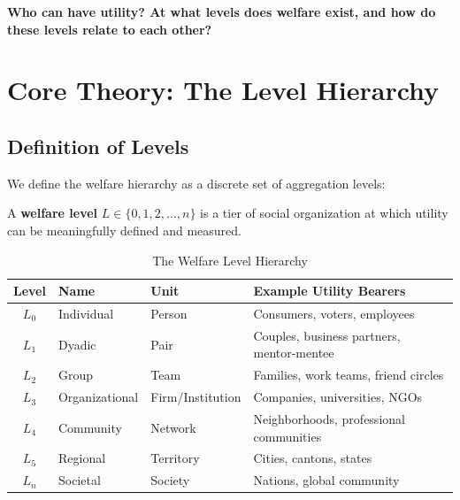 \begin{tcolorbox}[colback=red!5!white, colframe=red!75!black,
    title=The Fundamental Question]
\textbf{Who can have utility? At what levels does welfare exist, and how do these levels relate to each other?}
\end{tcolorbox}


\section{Core Theory: The Level Hierarchy}
\label{sec:who-levels}

\subsection{Definition of Levels}

We define the welfare hierarchy as a discrete set of aggregation levels:

\begin{definition}
A \textbf{welfare level} $L \in \{0, 1, 2, \ldots, n\}$ is a tier of social organization
at which utility can be meaningfully defined and measured.
\end{definition}

\begin{table}[htbp]
\centering
\caption{The Welfare Level Hierarchy}
\label{tab:who-levels}
\renewcommand{\arraystretch}{1.3}
\begin{tabular}{@{}clll@{}}
\toprule
\textbf{Level} & \textbf{Name} & \textbf{Unit} & \textbf{Example Utility Bearers} \\
\midrule
$L_0$ & Individual & Person & Consumers, voters, employees \\
$L_1$ & Dyadic & Pair & Couples, business partners, mentor-mentee \\
$L_2$ & Group & Team & Families, work teams, friend circles \\
$L_3$ & Organizational & Firm/Institution & Companies, universities, NGOs \\
$L_4$ & Community & Network & Neighborhoods, professional communities \\
$L_5$ & Regional & Territory & Cities, cantons, states \\
$L_n$ & Societal & Society & Nations, global community \\
\bottomrule
\end{tabular}
\end{table}

